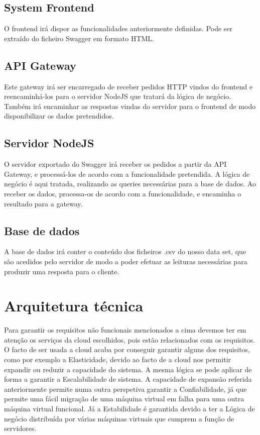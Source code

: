 \documentclass[11pt,a4paper]{article}
\begin{document}
\subsection{System Frontend}
O frontend irá dispor as funcionalidades anteriormente definidas. Pode ser extraído do ficheiro Swagger em formato HTML.
\newline

\subsection{API Gateway}
Este gateway irá ser encarregado de receber pedidos HTTP vindos do frontend e reencaminhá-los para o servidor NodeJS que tratará da lógica de negócio. Também irá encaminhar as respostas vindas do servidor para o frontend de modo disponibilizar os dados pretendidos.
\newline %


\subsection{Servidor NodeJS}
O servidor exportado do Swagger irá receber os pedidos a partir da API Gateway, e processá-los de acordo com a funcionalidade pretendida. A lógica de negócio é aqui tratada, realizando as queries necessárias para a base de dados. Ao receber os dados, processa-os de acordo com a funcionalidade, e encaminha o resultado para a gateway.
\newline %

\subsection{Base de dados}
A base de dados irá conter o conteúdo dos ficheiros .csv do nosso data set, que são acedidos pelo servidor de modo a poder efetuar as leituras necessárias para produzir uma resposta para o cliente. 

\section{Arquitetura técnica}

Para garantir os requisitos não funcionais mencionados a cima devemos ter em atenção os serviços da cloud escolhidos, pois estão relacionados com os requisitos.
\newline
O facto de ser usada a cloud acaba por conseguir garantir alguns dos requisitos, como por exemplo a Elasticidade, devido ao facto de a cloud nos permitir expandir ou reduzir a capacidade do sistema. A mesma lógica se pode aplicar de forma a garantir a Escalabilidade de sistema. A capacidade de expansão referida anteriormente permite numa outra perspetiva garantir a Confiabilidade, já que permite uma fácil migração de uma máquina virtual em falha para uma outra máquina virtual funcional. 
\newline
Já a Estabilidade é garantida devido a ter a Lógica de negócio distribuída por várias máquinas virtuais que cumprem a função de servidores.
\end{document}
